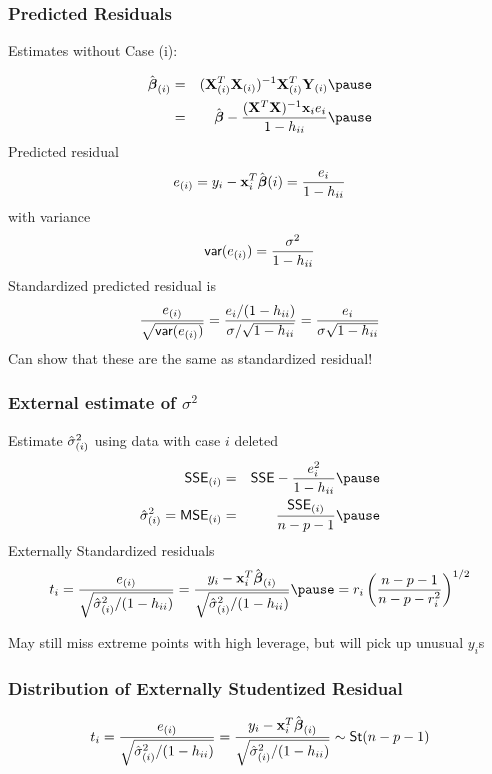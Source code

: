 \documentclass[]{beamer}
\begin{document}
  \begin{frame}
    \frametitle{Predicted Residuals}
Estimates without Case (i):

\begin{eqnarray*}
  \bhat_{(i)} & = & (\X_{(i)}^T\X_{(i)})^{-1 }\X_{(i)}^T \Y_{(i)}  \pause \\
 & = & \bhat - \frac{ (\X^T\X)^{-1} \x_i e_i}{ 1 - h_{ii}}   \pause
\end{eqnarray*}
 Predicted residual
$$ e_{(i)} = y_i - \mathbf{x}_i^T \hat{\boldsymbol{\beta}}{(i)} = \frac{e_i}{1 - h_{ii}}$$
 \pause
with variance
$$\textsf{var}(e_{(i)}) = \frac{\sigma^2}{1 - h_{ii}}$$
 \pause
Standardized predicted residual is 
$$\frac{e_{(i)}}{\sqrt{\textsf{var}(e_{(i)})}}  = \frac{e_i/(1 -
  h_{ii})}{\sigma/\sqrt{1 - h_{ii}}} = \frac{e_i}{\sigma \sqrt{1 -
    h_{ii}} } 
$$ \pause
Can show that these are the same as standardized residual!
  \end{frame}
  \begin{frame}
    \frametitle{External estimate of $\sigma^2$}
    Estimate ${\hat{\sigma}}^2_{(i)}$ using data with case $i$ deleted  \pause
    \begin{eqnarray*}
\SSE_{(i)} & = &  \SSE - \frac{e_i^2}{1 - h_{ii}}  \pause \\
\shat_{(i)} = \MSE_{(i)} & = &  \frac{\SSE_{(i)}}{n - p - 1}  \pause\\
    \end{eqnarray*}
Externally Standardized residuals  \pause
$$t_i = \frac{e_{(i)}}{\sqrt{\shat_{(i)}/(1 - h_{ii})}}  =  \frac{y_i
  - \x_i^T \bhat_{(i)}} {\sqrt{\shat_{(i)}/(1 - h_{ii})}} \pause =  r_i \left(
\frac{ n - p - 1}{n - p - r_i^2}\right)^{1/2}$$  \pause



May still miss extreme points with high leverage, but will pick up unusual $y_i$s
  \end{frame}
  \begin{frame}
    \frametitle{Distribution of Externally Studentized Residual}
\vspace{-48pt}
    $$t_i = \frac{e_{(i)}}{\sqrt{{\hat{\sigma}}^2_{(i)}/(1 - h_{ii})}}  =  \frac{y_i
  - \mathbf{x}_i^T \hat{\boldsymbol{\beta}}_{(i)}} {\sqrt{{\hat{\sigma}}^2_{(i)}/(1 - h_{ii})}}  \sim \textsf{St}(n
- p - 1)$$

\vfill

  \end{frame}
\end{document}
